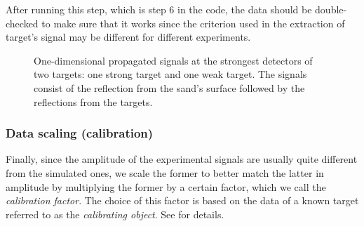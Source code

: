 \documentclass[a4paper,12pt]{article}
\begin{document}
After running this step, which is step 6 in the code, the data should be double-checked to make sure that it works since the criterion used in the extraction of target's signal may be different for different experiments. 



\begin{figure}[tph]
\centering
{} 
\caption{One-dimensional propagated signals at the strongest detectors of
two targets: one strong target and one weak target. 
The signals consist of the reflection from the sand's surface followed by the
reflections from the targets.}
\label{fig:4.3}
\end{figure}





\subsubsection{Data scaling (calibration)}
Finally, since the amplitude of
the experimental signals are usually quite different
from the simulated ones, we scale the former to better match the latter in amplitude by multiplying the former by a certain factor, which we call  the
\emph{calibration factor}. The choice of this factor is based on the data of a known
target referred to as the \textit{calibrating object}. See \cite{TBKF:SISC2014} for details. 
\end{document}
